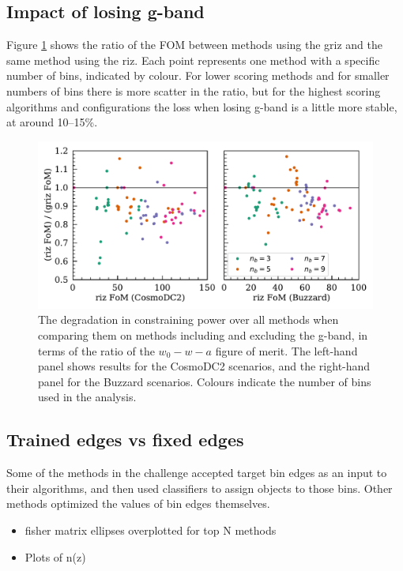 \documentclass[twocolumn,twocolappendix]{aastex63}
\begin{document}
\subsection{Impact of losing g-band}
Figure \ref{fig:loss} shows the ratio of the FOM between methods using the griz and the same method
using the riz.  Each point represents one method with a specific number of bins, indicated by colour.
For lower scoring methods and for smaller numbers of bins there is more scatter in the ratio,
but for the highest scoring algorithms and configurations the loss when losing g-band is a little
more stable, at around 10--15\%.


\begin{figure}
\includegraphics[width=0.9\linewidth]{results/g_band_loss.pdf}
\caption{The degradation in constraining power over all methods
 when comparing them on methods including and excluding
the g-band, in terms of the ratio of the $w_0-w-a$ figure of merit.  The left-hand panel shows
results for the CosmoDC2 scenarios, and the right-hand panel for the Buzzard scenarios.  Colours
indicate the number of bins used in the analysis.}
\label{fig:loss}
\end{figure}

\subsection{Trained edges vs fixed edges}

Some of the methods in the challenge accepted target bin edges as an input to their algorithms,
and then used classifiers to assign objects to those bins.  Other methods optimized the values
of bin edges themselves.



\begin{itemize}
    \item fisher matrix ellipses overplotted for top N methods
    \item Plots of n(z)
\end{itemize}
\end{document}
